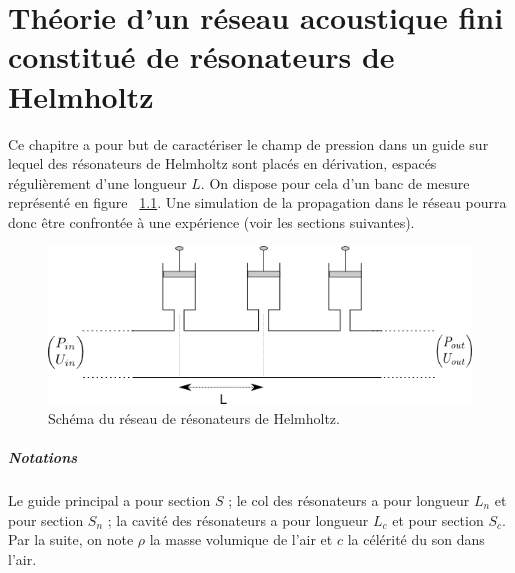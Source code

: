 \chapter{Théorie d'un réseau acoustique fini constitué de résonateurs de Helmholtz}
Ce chapitre a pour but de caractériser le champ de pression dans un guide sur lequel des résonateurs de Helmholtz sont placés en dérivation, espacés régulièrement d'une longueur $L$. On dispose pour cela d'un banc de mesure représenté en figure ~\ref{schema_infini}. Une simulation de la propagation dans le réseau pourra donc être confrontée à une expérience (voir les sections suivantes).

\begin{figure}[!ht] \centering
\includegraphics[scale=0.5]{./images_chp1/schema_reseau_infini.png}
\caption{\label{schema_infini} Schéma du réseau de résonateurs de Helmholtz.}
\end{figure}

\paragraph{Notations}
Le guide principal a pour section $S$ ; le col des résonateurs a pour longueur $L_{n}$ et pour section $S_{n}$ ; la cavité des résonateurs a pour longueur $L_{c}$ et pour section $S_{c}$. Par la suite, on note $\rho$ la masse volumique de l'air et $c$ la célérité du son dans l'air.

